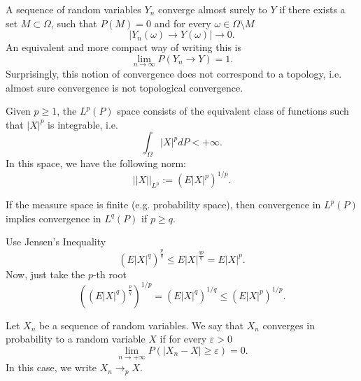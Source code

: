 \begin{definition}
	A sequence of random variables $Y_n$ converge almost surely to $Y$ if
	there exists a set $M \subset \Omega$,
	such that $P(M)=0$ and for every $\omega \in \Omega \setminus M$
	\begin{equation}
		|Y_n(\omega) \to Y(\omega)| \to 0.
	\end{equation}
	An equivalent and more compact way of writing this is
	\begin{equation}
		\lim_{n \to \infty}P(Y_n \to Y) =1.
	\end{equation}
	Surprisingly, this notion of convergence does not correspond to a topology, i.e.
	almost sure convergence is not topological convergence.
\end{definition}

Given $p \geq 1$, the $L^p(P)$ space consists of the equivalent class
of functions such that $|X|^p$ is integrable, i.e.
\begin{equation}
	\int_\Omega |X|^p dP < +\infty.
\end{equation}
In this space, we have the following norm:
\begin{equation}
	||X||_{L^p} := (E|X|^p)^{1/p}.
\end{equation}

\begin{theorem}
	If the measure space is finite (e.g. probability space), then convergence
	in $L^{p}(P)$ implies convergence in $L^{q}(P)$ if
	$p\geq q$.
\end{theorem}
\begin{prf}
	Use Jensen's Inequality
	\begin{equation*}
		(E|X|^q)^{\frac{p}{q}} \leq E|X|^{\frac{q p}{q}} = E|X|^p.
	\end{equation*}
	Now, just take the $p$-th root
	\begin{equation*}
		((E|X|^q)^{\frac{p}{q}})^{1/p} = (E|X|^q)^{1/q} \leq (E|X|^p)^{1/p}.
	\end{equation*}
\end{prf}

\begin{definition}
	Let $X_n$ be a sequence of random variables. We say that
	$X_n$ converges in probability to a random variable $X$ if
	for every $\varepsilon >0$
	\begin{equation}
		\lim_{n\to +\infty} P(|X_n - X|\geq \varepsilon) =0.
	\end{equation}
	In this case, we write $X_n \to_p X$.
\end{definition}

